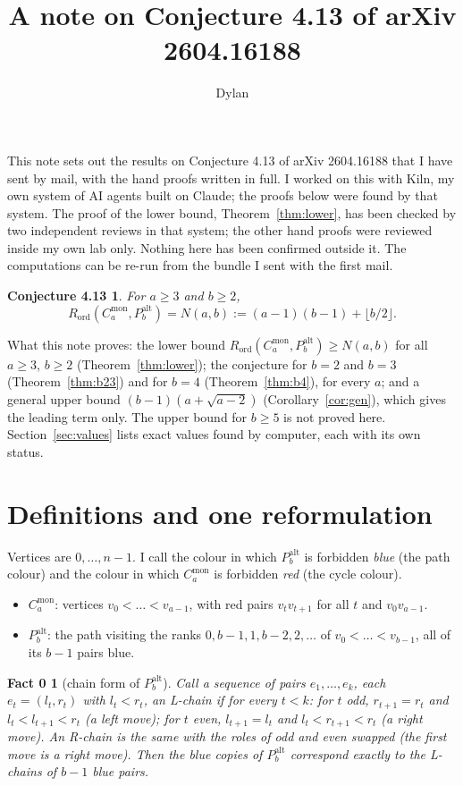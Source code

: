 \documentclass[11pt]{article}
\title{A note on Conjecture 4.13 of arXiv 2604.16188}
\author{Dylan}
\date{}
\newcommand{\Rord}{R_{\mathrm{ord}}}
\newcommand{\Cmon}[1]{C_{#1}^{\mathrm{mon}}}
\newcommand{\Palt}[1]{P_{#1}^{\mathrm{alt}}}
\theoremstyle{plain}
\newtheorem*{conjecture}{Conjecture 4.13}
\newtheorem*{fact0}{Fact 0}
\theoremstyle{remark}
\begin{document}
\maketitle

This note sets out the results on Conjecture 4.13 of arXiv 2604.16188 that I have sent by mail, with the hand
proofs written in full. I worked on this with Kiln, my own system of AI agents built on Claude; the proofs below
were found by that system. The proof of the lower bound, Theorem~\ref{thm:lower}, has been checked by two
independent reviews in that system; the other hand proofs were reviewed inside my own lab only. Nothing here has
been confirmed outside it. The computations can be re-run from
the bundle I sent with the first mail.

\begin{conjecture}
For $a \geq 3$ and $b \geq 2$,
\[
  \Rord(\Cmon{a}, \Palt{b}) = N(a,b) := (a-1)(b-1) + \lfloor b/2 \rfloor .
\]
\end{conjecture}

What this note proves: the lower bound $\Rord(\Cmon{a}, \Palt{b}) \geq N(a,b)$ for all $a \geq 3$, $b \geq 2$
(Theorem~\ref{thm:lower}); the conjecture for $b = 2$ and $b = 3$ (Theorem~\ref{thm:b23}) and for $b = 4$
(Theorem~\ref{thm:b4}), for every $a$; and a general upper bound $(b-1)(a + \sqrt{a-2})$ (Corollary~\ref{cor:gen}),
which gives the leading term only. The upper bound for $b \geq 5$ is not proved here. Section~\ref{sec:values}
lists exact values found by computer, each with its own status.

\section{Definitions and one reformulation}

Vertices are $0, \dots, n-1$. I call the colour in which $\Palt{b}$ is forbidden \emph{blue} (the path colour) and
the colour in which $\Cmon{a}$ is forbidden \emph{red} (the cycle colour).

\begin{itemize}
  \item $\Cmon{a}$: vertices $v_0 < \dots < v_{a-1}$, with red pairs $v_t v_{t+1}$ for all $t$ and $v_0 v_{a-1}$.
  \item $\Palt{b}$: the path visiting the ranks $0, b-1, 1, b-2, 2, \dots$ of $v_0 < \dots < v_{b-1}$, all of its
  $b-1$ pairs blue.
\end{itemize}

\begin{fact0}[chain form of $\Palt{b}$]
Call a sequence of pairs $e_1, \dots, e_k$, each $e_t = (l_t, r_t)$ with $l_t < r_t$, an \emph{L-chain} if for
every $t < k$: for $t$ odd, $r_{t+1} = r_t$ and $l_t < l_{t+1} < r_t$ (a \emph{left move}); for $t$ even,
$l_{t+1} = l_t$ and $l_t < r_{t+1} < r_t$ (a \emph{right move}). An \emph{R-chain} is the same with the roles of
odd and even swapped (the first move is a right move). Then the blue copies of $\Palt{b}$ correspond exactly to
the L-chains of $b-1$ blue pairs.
\end{fact0}
\end{document}
